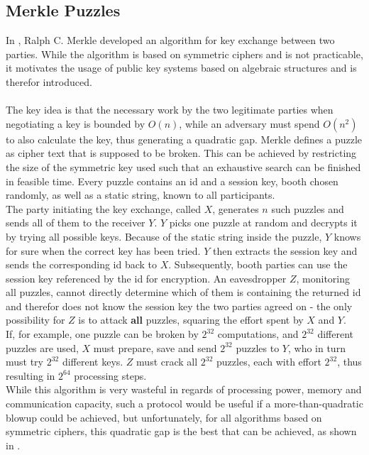 \subsection{Merkle Puzzles}
In \cite{Merkle}, Ralph C. Merkle developed an algorithm for key exchange between two parties. While the algorithm is based on symmetric ciphers and is
not practicable, it motivates the usage of public key systems based on algebraic structures and is therefor introduced.
\\
\\
The key idea is that the necessary work by the two legitimate parties when negotiating a key is bounded by $O(n)$, while an adversary must spend $O(n^2)$ to 
also calculate the key, thus generating a quadratic gap. 
Merkle defines a puzzle as cipher text that is supposed to be broken. This can be achieved by restricting the size of the symmetric key used such that an
exhaustive search can be finished in feasible time. Every puzzle contains an id and a session key, booth chosen randomly, as well as a static string,
known to all participants.
\\
The party initiating the key exchange, called $X$, generates $n$ such puzzles and sends all of them to the receiver $Y$. $Y$ picks one puzzle at random and
decrypts it by trying all possible keys. Because of the static string inside the puzzle, $Y$ knows for sure when the correct key has been tried.
$Y$ then extracts the session key and sends the corresponding id back to $X$. Subsequently, booth parties can use the session key referenced by the id for encryption.
An eavesdropper $Z$, monitoring all puzzles, cannot directly determine which of them is containing the returned id and therefor does not know the session key the 
two parties agreed on - the only possibility for $Z$ is to attack \textbf{all} puzzles, squaring the effort spent by $X$ and $Y$.
\\
If, for example, one puzzle can be broken by $2^{32}$ computations, and $2^{32}$ different puzzles are used, $X$ must prepare, save and send $2^{32}$ puzzles
to $Y$, who in turn must try $2^{32}$ different keys. $Z$ must crack all $2^{32}$ puzzles, each with effort $2^{32}$, thus resulting in $2^{64}$ processing steps.
\\
While this algorithm is very wasteful in regards of processing power, memory and communication capacity, such a protocol would be useful if a more-than-quadratic
blowup could be achieved, but unfortunately, for all algorithms based on symmetric ciphers, this quadratic gap is the best that can be achieved,
as shown in \cite{Barak09merklepuzzles}.   
\\
 
